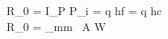 R_0 = {I_P \over P_i} = {\eta q \over hf} = {\eta q \lambda \over hc}\\
R_0 = {\eta \lambda_{mm} }\ {A \over W}